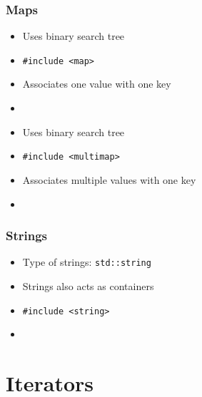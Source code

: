 \begin{frame}
  \frametitle{Maps}
  \begin{itemize}
    \item Uses binary search tree
    \item \texttt{\#include <map>}
    \item Associates one value with one key
    \item {}
  \end{itemize}
  \vskip5mm
  \begin{itemize}
    \item Uses binary search tree
    \item \texttt{\#include <multimap>}
    \item Associates multiple values with one key
    \item {}
  \end{itemize}
\end{frame}

\begin{frame}
  \frametitle{Strings}
  \begin{itemize}
    \item Type of strings: \texttt{std::string}
    \item Strings also acts as containers
    \item \texttt{\#include <string>}
    \item {}
  \end{itemize}
\end{frame}


\section{Iterators}

\frame{\tableofcontents[currentsection]}

